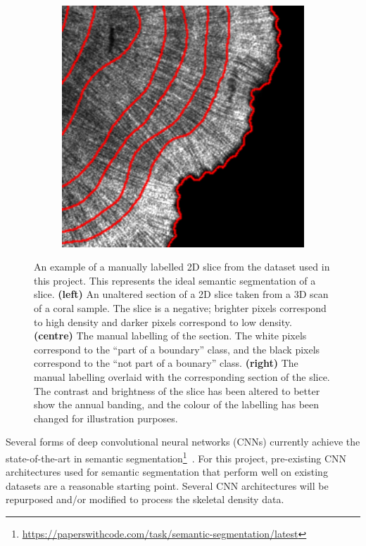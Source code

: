 \begin{figure}[t]
\begin{subfigure}[t]{0.32\textwidth}
    \end{subfigure}
    ~
    \begin{subfigure}[t]{0.32\textwidth}
        \centering
        \includegraphics[width=1\textwidth, valign=c]{images/label-example-3.png}
    \end{subfigure}
    \caption{An example of a manually labelled 2D slice from the dataset used in this project. This represents the ideal semantic segmentation of a slice. \textbf{(left)} An unaltered section of a 2D slice taken from a 3D scan of a coral sample. The slice is a negative; brighter pixels correspond to high density and darker pixels correspond to low density. \textbf{(centre)} The manual labelling of the section. The white pixels correspond to the ``part of a boundary'' class, and the black pixels correspond to the ``not part of a bounary'' class. \textbf{(right)} The manual labelling overlaid with the corresponding section of the slice. The contrast and brightness of the slice has been altered to better show the annual banding, and the colour of the labelling has been changed for illustration purposes.}
    \label{fig:example-label}
\end{figure}

Several forms of deep convolutional neural networks (CNNs) currently achieve the state-of-the-art in semantic segmentation\footnote{\url{https://paperswithcode.com/task/semantic-segmentation/latest}}~\cite{chen2018encoder, semanticseg-SOTA}. For this project, pre-existing CNN architectures used for semantic segmentation that perform well on existing datasets are a reasonable starting point. Several CNN architectures will be repurposed and/or modified to process the skeletal density data.

